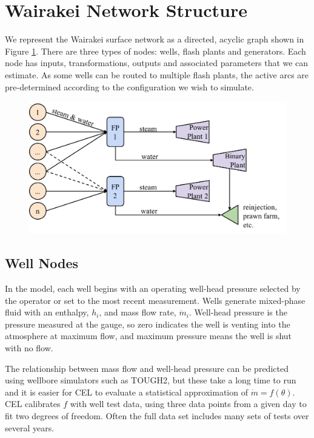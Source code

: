 \documentclass[a4paper, 12pt]{article}
\begin{document}
\section{Wairakei Network Structure}

We represent the Wairakei surface network as a directed, acyclic graph shown in Figure \ref{fig:network_diagram}. There are three types of nodes: wells, flash plants and generators. Each node has inputs, transformations, outputs and associated parameters that we can estimate. As some wells can be routed to multiple flash plants, the active arcs are pre-determined according to the configuration we wish to simulate.

\begin{figure}
  \centering
  \includegraphics[width=0.5\linewidth]{media/network_diagram}
  \label{fig:network_diagram}
\end{figure}

\subsection{Well Nodes}
In the model, each well begins with an operating well-head pressure selected by the operator or set to the most recent measurement. Wells generate mixed-phase fluid with an enthalpy, $h_i$, and mass flow rate, $\dot{m}_i$. Well-head pressure is the pressure measured at the gauge, so zero indicates the well is venting into the atmosphere at maximum flow, and maximum pressure means the well is shut with no flow.

The relationship between mass flow and well-head pressure can be predicted using wellbore simulators such as TOUGH2, but these take a long time to run and it is easier for CEL to evaluate a statistical approximation of $\dot{m} = f(\theta)$. CEL calibrates $f$ with well test data, using three data points from a given day to fit two degrees of freedom. Often the full data set includes many sets of tests over several years.
\end{document}
